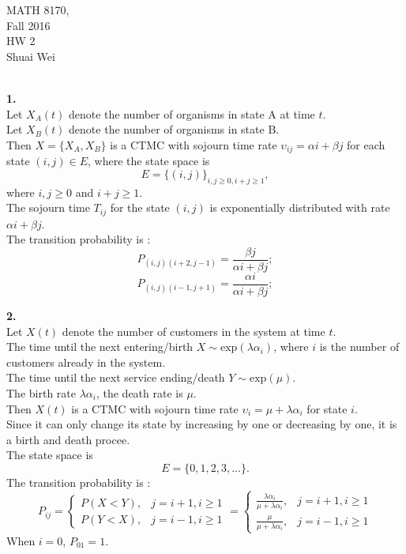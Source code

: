 \documentclass{amsart}
\theoremstyle{plain}
\theoremstyle{definition}
\begin{document}
\noindent MATH 8170,  \\
Fall 2016\\
HW 2\\
Shuai Wei \\
\
\textwidth 6.0in \oddsidemargin 0.0in

\noindent \textbf{1.} \\
Let $X_A(t)$ denote the number of organisms in state A at time $t$.\\
Let $X_B(t)$ denote the number of organisms in state B.\\
Then $X = \{X_A, X_B\}$ is a CTMC with sojourn time rate $\upsilon_{ij} = \alpha i + \beta j$ for each state $(i,j) \in E$, where the state space is 
\[E = \{(i,j)\}_{i,j\geq 0,i +j \geq 1} ,\]
where $i,j \geq 0$ and $i+j \geq 1 $.\\
The sojourn time $T_{ij}$ for the state $(i,j)$ is exponentially distributed with rate $\alpha i + \beta j$.\\
The transition probability is :
\[ P_{(i,j)(i+2,j-1)} = \frac{\beta j}{\alpha i + \beta j}; \]
\[ P_{(i,j)(i-1,j+1)} = \frac{\alpha i}{\alpha i + \beta j}; \]

\newpage

\noindent \textbf{2.}\\
Let $X(t)$ denote the number of customers in the system at time $t$. \\
The time until the next entering/birth $X \sim \text{exp}(\lambda \alpha_i)$, where $i$ is the number of customers already in the system.\\
The time until the next service ending/death $Y \sim \text{exp}(\mu)$.\\
The birth rate $\lambda \alpha_i $, the death rate is $\mu$.\\
Then $X(t)$ is a CTMC with sojourn time rate $\upsilon_i = \mu+ \lambda \alpha_i$ for state $i$.\\
Since it can only change its state by increasing by one or decreasing by one, it is a birth and death procee.\\
The state space is 
\[E= \{0,1,2,3,...\}.\]
The transition probability is :
\[ 
  	P_{ij}  =  \left\{ 
					\begin{array}{ll}
  					  P(X<Y), & j = i+1, i\geq 1 \\ 
					  P(Y<X),& j = i-1, i\geq 1  
					\end{array}
			 	  \right. 
  	           =  \left\{ 
					\begin{array}{ll}
  					  \frac{\lambda \alpha_i}{\mu + \lambda \alpha_i}, & j = i+1, i\geq 1 \\ 
					  \frac{\mu}{\mu+\lambda\alpha_i},& j = i-1, i\geq 1  
					\end{array}
			 	  \right. 
\]
When $i = 0$, $P_{01} = 1$.
\end{document}

